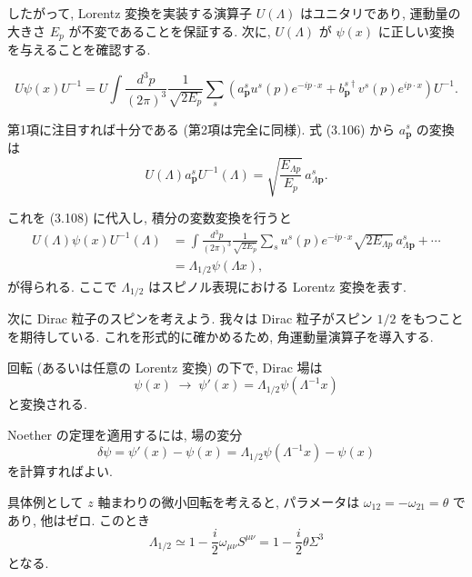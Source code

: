 \documentclass[a4paper,12pt]{article}
\begin{document}
したがって, Lorentz 変換を実装する演算子 $U(\Lambda)$ はユニタリであり, 運動量の大きさ $E_p$ が不変であることを保証する.  
次に, $U(\Lambda)$ が $\psi(x)$ に正しい変換を与えることを確認する.  

\begin{equation}
U \psi(x) U^{-1} = U \int \frac{d^3p}{(2\pi)^3}\frac{1}{\sqrt{2E_p}}
\sum_s \left( a^s_{\mathbf{p}} u^s(p)e^{-ip\cdot x} + b^{s\dagger}_{\mathbf{p}} v^s(p)e^{ip\cdot x} \right) U^{-1}.
\tag{3.108}
\end{equation}

第1項に注目すれば十分である (第2項は完全に同様). 式 (3.106) から $a^s_{\mathbf{p}}$ の変換は
\begin{equation}
U(\Lambda) a^s_{\mathbf{p}} U^{-1}(\Lambda) = \sqrt{\frac{E_{\Lambda p}}{E_p}}\, a^s_{\Lambda \mathbf{p}}.
\tag{3.109}
\end{equation}

これを (3.108) に代入し, 積分の変数変換を行うと
\begin{align}
U(\Lambda)\psi(x)U^{-1}(\Lambda)
&= \int \frac{d^3p}{(2\pi)^3}\frac{1}{\sqrt{2E_p}} 
\sum_s u^s(p) e^{-ip\cdot x} \sqrt{2E_{\Lambda p}}\, a^s_{\Lambda \mathbf{p}} + \cdots \\
&= \Lambda_{1/2} \psi(\Lambda x),
\tag{3.110}
\end{align}
が得られる. ここで $\Lambda_{1/2}$ はスピノル表現における Lorentz 変換を表す.

次に Dirac 粒子のスピンを考えよう. 我々は Dirac 粒子がスピン $1/2$ をもつことを期待している.  
これを形式的に確かめるため, 角運動量演算子を導入する.  

回転 (あるいは任意の Lorentz 変換) の下で, Dirac 場は
\begin{equation}
\psi(x) \;\to\; \psi'(x) = \Lambda_{1/2} \psi(\Lambda^{-1} x)
\end{equation}
と変換される.  

Noether の定理を適用するには, 場の変分
\begin{equation}
\delta \psi = \psi'(x) - \psi(x) = \Lambda_{1/2}\psi(\Lambda^{-1}x) - \psi(x)
\end{equation}
を計算すればよい.  

具体例として $z$ 軸まわりの微小回転を考えると, パラメータは $\omega_{12}=-\omega_{21}=\theta$ であり, 他はゼロ.  
このとき
\begin{equation}
\Lambda_{1/2} \simeq 1 - \frac{i}{2}\omega_{\mu\nu}S^{\mu\nu}
= 1 - \frac{i}{2}\theta \Sigma^3
\end{equation}
となる.  
\end{document}
